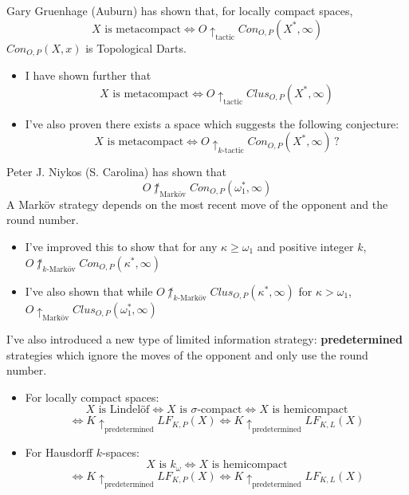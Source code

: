 \documentclass{beamer}
\newcommand{\prewin}{\uparrow_{\text{predetermined}}}
\newcommand{\markwin}{\uparrow_{\text{Mark\"ov}}}
\newcommand{\tactwin}{\uparrow_{\text{tactic}}}
\newcommand{\ktactwin}[1]{\uparrow_{#1\text{-tactic}}}
\newcommand{\kmarkwin}[1]{\uparrow_{#1\text{-Mark\"ov}}}
\newcommand{\oneptcomp}[1]{#1^*}
\newcommand{\congame}[2]{Con_{O,P}(#1,#2)}
\newcommand{\clusgame}[2]{Clus_{O,P}(#1,#2)}
\newcommand{\lfkpgame}[1]{LF_{K,P}(#1)}
\newcommand{\lfklgame}[1]{LF_{K,L}(#1)}
\begin{document}
\begin{frame}
  Gary Gruenhage (Auburn) has shown that, for locally compact spaces,
    \[
      X \text{ is metacompact} \Leftrightarrow O \tactwin \congame{\oneptcomp{X}}{\infty}
    \]
  {\tiny $\congame{X}{x}$ is Topological Darts.}
  \pause
  \begin{itemize}
    \item
      I have shown further that 
    \[
      X \text{ is metacompact} \Leftrightarrow O \tactwin \clusgame{\oneptcomp{X}}{\infty}
    \]
    \pause
    \item
      I've also proven there exists a space which suggests the following conjecture:
    \[
      X \text{ is metacompact} \Leftrightarrow O \ktactwin{k} \congame{\oneptcomp{X}}{\infty} \, ?
    \]
  \end{itemize}
\end{frame}

\begin{frame}
  Peter J. Niykos (S. Carolina) has shown that 
    \[
      O \not\markwin \congame{\oneptcomp{\omega_1}}{\infty}
    \]
  {\tiny A Mark\"ov strategy depends on the most recent move of the opponent and the round number.}
  \pause
  \begin{itemize}
    \item
      I've improved this to show that for any $\kappa \geq \omega_1$ and positive integer $k$, $O \not\kmarkwin{k} \congame{\oneptcomp{\kappa}}{\infty}$
    \pause
    \item
      I've also shown that while $O \not\kmarkwin{k} \clusgame{\oneptcomp{\kappa}}{\infty}$ for $\kappa>\omega_1$, $O \markwin \clusgame{\oneptcomp{\omega_1}}{\infty}$
  \end{itemize}
\end{frame}

\begin{frame}
  I've also introduced a new type of limited information strategy: \textbf{predetermined} strategies which ignore the moves of the opponent and only use the round number.
  \pause
  \begin{itemize}
    \item
    For locally compact spaces:
      \[
        X \text{ is Lindel\"of} \Leftrightarrow X \text{ is } \sigma\text{-compact} \Leftrightarrow X \text{ is hemicompact}
      \]
      \[
        \Leftrightarrow K \prewin \lfkpgame{X} \Leftrightarrow K \prewin \lfklgame{X}
      \]
    \pause
    \item
    For Hausdorff $k$-spaces:
      \[
        X \text{ is } k_\omega \Leftrightarrow X \text{ is hemicompact}
      \]
      \[
        \Leftrightarrow K \prewin \lfkpgame{X} \Leftrightarrow K \prewin \lfklgame{X}
      \]
  \end{itemize}
\end{frame}
\end{document}

